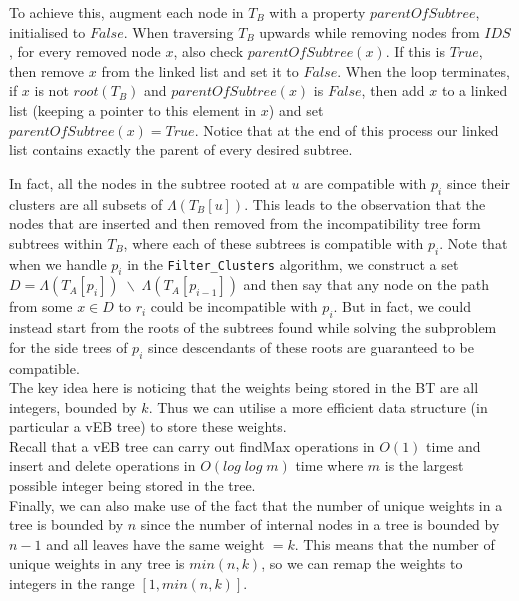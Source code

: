 \documentclass[a4paper]{article}
\begin{document}
    To achieve this, augment each node in $T_B$ with a property $parentOfSubtree$, initialised to $False$. When traversing $T_B$ upwards while removing nodes from $IDS$, for every removed node $x$, also check $parentOfSubtree(x)$. If this is $True$, then remove $x$ from the linked list and set it to $False$. When the loop terminates, if $x$ is not $root(T_B)$ and $parentOfSubtree(x)$ is $False$, then add $x$ to a linked list (keeping a pointer to this element in $x$) and set $parentOfSubtree(x) = True$. Notice that at the end of this process our linked list contains exactly the parent of every desired subtree.

    In fact, all the nodes in the subtree rooted at $u$ are compatible with $p_i$ since their clusters are all subsets of $\Lambda(T_B[u])$. This leads to the observation that the nodes that are inserted and then removed from the incompatibility tree form subtrees within $T_B$, where each of these subtrees is compatible with $p_i$. Note that when we handle $p_i$ in the \texttt{Filter\_Clusters} algorithm, we construct a set $D = \Lambda(T_A[p_i]) \;\backslash\; \Lambda(T_A[p_{i-1}])$ and then say that any node on the path from some $x \in D$ to $r_i$ could be incompatible with $p_i$. But in fact, we could instead start from the roots of the subtrees found while solving the subproblem for the side trees of $p_i$ since descendants of these roots are guaranteed to be compatible.\\

    The key idea here is noticing that the weights being stored in the BT are all integers, bounded by $k$. Thus we can utilise a more efficient data structure (in particular a vEB tree) to store these weights.\\

    Recall that a vEB tree can carry out findMax operations in $O(1)$ time and insert and delete operations in $O(log\;log\;m)$ time where $m$ is the largest possible integer being stored in the tree.\\

    Finally, we can also make use of the fact that the number of unique weights in a tree is bounded by $n$ since the number of internal nodes in a tree is bounded by $n - 1$ and all leaves have the same weight $= k$. This means that the number of unique weights in any tree is $min(n, k)$, so we can remap the weights to integers in the range $[1, min(n, k)]$.\\
\end{document}
